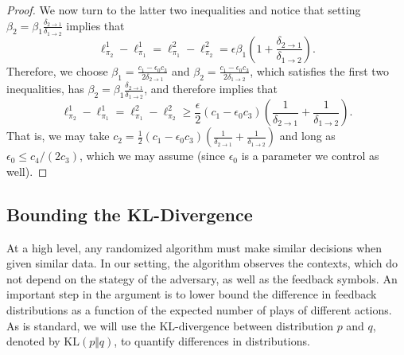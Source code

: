 \documentclass{article}
\newcommand{\KL}{\mathrm{KL}}
\begin{document}
\begin{proof}


We now turn to the latter two inequalities and notice that setting $\beta_2 =  \beta_1 \frac{\delta_{2\rightarrow 1}}{\delta_{1\rightarrow 2}}$ implies that 
\[
  \ell_{\pi_2}^1 - \ell_{\pi_1}^1 = \ell_{\pi_1}^2-\ell_{\pi_2}^2 = \epsilon \beta_1 \left( 1 + \frac{\delta_{2\rightarrow 1}}{\delta_{1\rightarrow 2}}\right).
\]
Therefore, we choose  $\beta_1 =\frac{ c_1 - \epsilon_0 c_3}{2\delta_{2\rightarrow 1}}$ and
$\beta_2 = \frac{ c_1 - \epsilon_0 c_3}{2\delta_{1\rightarrow 2}}$, which satisfies the first two inequalities, has $\beta_2 =  \beta_1 \frac{\delta_{2\rightarrow 1}}{\delta_{1\rightarrow 2}}$, and therefore implies that
\[
  \ell_{\pi_2}^1 - \ell_{\pi_1}^1 = \ell_{\pi_1}^2-\ell_{\pi_2}^2 \geq \frac{\epsilon}{2} ( c_1 - \epsilon_0 c_3) \left( \frac{1}{\delta_{2\rightarrow 1}} + 
    \frac{1}{\delta_{1\rightarrow 2}}\right).
\]
That is, we may take $c_2 = \frac12( c_1 - \epsilon_0 c_3) \left( \frac{1}{\delta_{2\rightarrow 1}} + 
  \frac{1}{\delta_{1\rightarrow 2}}\right)$
and long as $\epsilon_0 \leq c_4/(2c_3)$, which we may assume (since $\epsilon_0$ is a parameter we control as well).
\end{proof}

\subsection{Bounding the KL-Divergence}
At a high level, any randomized algorithm must make similar decisions when given similar data. In our setting, the algorithm observes the contexts, which do not depend on the stategy of the adversary, as well as the feedback symbols. An important step in the argument is to lower bound the difference in feedback distributions as a function of the expected number of plays of different actions. As is standard, we will use the KL-divergence between distribution $p$ and $q$, denoted by $\KL(p\Vert q)$, to quantify differences in distributions. 
\end{document}

